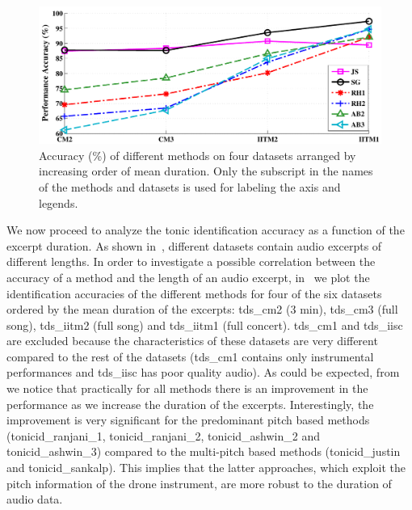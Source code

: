 {\begin{figure}
	\begin{center}
		\includegraphics[width=\figSizeNinety]{ch05_preprocessing/figures/Accuracy_Length.pdf}
	\end{center}
	\caption[Tonic identification accuracies of different approaches on four datasets ordered by their mean recording duration]{Accuracy (\%) of different methods on four datasets arranged by increasing order of mean duration. Only the subscript in the names of the methods and datasets is used for labeling the axis and legends.}
	\label{fig:tonic_id_accuracy_vs_length}
\end{figure}


We now proceed to analyze the tonic identification accuracy as a function of the excerpt duration. As shown in~, different datasets contain audio excerpts of different lengths. In order to investigate a possible correlation between the accuracy of a method and the length of an audio
excerpt, in~ we plot the identification accuracies of the different methods for four of the six datasets ordered
by the mean duration of the excerpts: \acrshort{tds_cm2} (3 min), \acrshort{tds_cm3} (full song), \acrshort{tds_iitm2} (full song) and \acrshort{tds_iitm1} (full concert). \acrshort{tds_cm1} and \acrshort{tds_iisc} are excluded because the characteristics of these datasets are very different compared to the rest of the datasets (\acrshort{tds_cm1} contains only instrumental performances and \acrshort{tds_iisc} has poor quality audio). As could be expected, from~ we notice that practically for all methods there is an improvement in the performance as we increase the duration
of the excerpts. Interestingly, the improvement is very significant for the predominant pitch based methods (\acrshort{tonicid_ranjani_1}, \acrshort{tonicid_ranjani_2}, \acrshort{tonicid_ashwin_2} and \acrshort{tonicid_ashwin_3}) compared to the multi-pitch based methods (\acrshort{tonicid_justin} and \acrshort{tonicid_sankalp}). This implies that the latter approaches, which exploit the pitch information of the drone instrument, are more robust to the duration of audio data.

}
